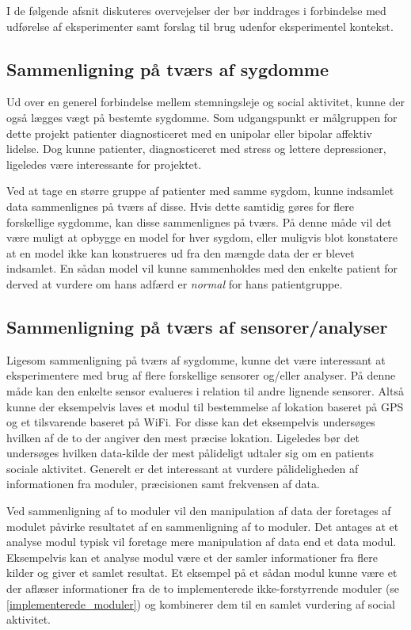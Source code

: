 I de følgende afsnit diskuteres overvejelser der bør inddrages i forbindelse med udførelse af eksperimenter samt forslag til brug udenfor eksperimentel kontekst.

\subsection{Sammenligning på tværs af sygdomme}\label{refleksion:tvaers_af_sygdomme}
Ud over en generel forbindelse mellem stemningsleje og social aktivitet, kunne der også lægges vægt på bestemte sygdomme.
Som udgangspunkt er målgruppen for dette projekt patienter diagnosticeret med en unipolar eller bipolar affektiv lidelse.
Dog kunne patienter, diagnosticeret med stress og lettere depressioner, ligeledes være interessante for projektet.

Ved at tage en større gruppe af patienter med samme sygdom, kunne indsamlet data sammenlignes på tværs af disse.
Hvis dette samtidig gøres for flere forskellige sygdomme, kan disse sammenlignes på tværs.
På denne måde vil det være muligt at opbygge en model for hver sygdom, eller muligvis blot konstatere at en model ikke kan konstrueres ud fra den mængde data der er blevet indsamlet.
En sådan model vil kunne sammenholdes med den enkelte patient for derved at vurdere om hans adfærd er \textit{normal} for hans patientgruppe.

\subsection{Sammenligning på tværs af sensorer/analyser}
Ligesom sammenligning på tværs af sygdomme, kunne det være interessant at eksperimentere med brug af flere forskellige sensorer og/eller analyser.
På denne måde kan den enkelte sensor evalueres i relation til andre lignende sensorer.
Altså kunne der eksempelvis laves et modul til bestemmelse af lokation baseret på GPS og et tilsvarende baseret på WiFi.
For disse kan det eksempelvis undersøges hvilken af de to der angiver den mest præcise lokation.
Ligeledes bør det undersøges hvilken data-kilde der mest pålideligt udtaler sig om en patients sociale aktivitet.
Generelt er det interessant at vurdere pålideligheden af informationen fra moduler, præcisionen samt frekvensen af data.

Ved sammenligning af to moduler vil den manipulation af data der foretages af modulet påvirke resultatet af en sammenligning af to moduler.
Det antages at et analyse modul typisk vil foretage mere manipulation af data end et data modul.
Eksempelvis kan et analyse modul være et der samler informationer fra flere kilder og giver et samlet resultat.
Et eksempel på et sådan modul kunne være et der aflæser informationer fra de to implementerede ikke-forstyrrende moduler (se \cref{implementerede_moduler}) og kombinerer dem til en samlet vurdering af social aktivitet.

